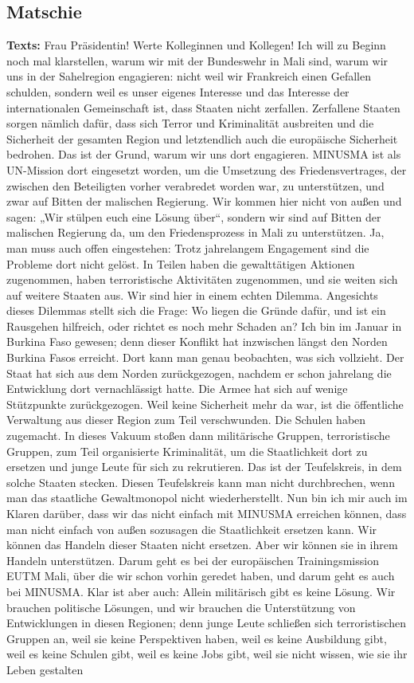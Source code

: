 \documentclass{article}
\begin{document}
\subsection{Matschie}
\noindent\textbf{Texts:} Frau Präsidentin! Werte Kolleginnen und Kollegen! Ich will zu Beginn noch mal klarstellen, warum wir mit der Bundeswehr in Mali sind, warum wir uns in der Sahelregion engagieren: nicht weil wir Frankreich einen Gefallen schulden, sondern weil es unser eigenes Interesse und das Interesse der internationalen Gemeinschaft ist, dass Staaten nicht zerfallen. Zerfallene Staaten sorgen nämlich dafür, dass sich Terror und Kriminalität ausbreiten und die Sicherheit der gesamten Region und letztendlich auch die europäische Sicherheit bedrohen. Das ist der Grund, warum wir uns dort engagieren.  MINUSMA ist als UN-Mission dort eingesetzt worden, um die Umsetzung des Friedensvertrages, der zwischen den Beteiligten vorher verabredet worden war, zu unterstützen, und zwar auf Bitten der malischen Regierung. Wir kommen hier nicht von außen und sagen: „Wir stülpen euch eine Lösung über“, sondern wir sind auf Bitten der malischen Regierung da, um den Friedensprozess in Mali zu unterstützen. Ja, man muss auch offen eingestehen: Trotz jahrelangem Engagement sind die Probleme dort nicht gelöst. In Teilen haben die gewalttätigen Aktionen zugenommen, haben terroristische Aktivitäten zugenommen, und sie weiten sich auf weitere Staaten aus. Wir sind hier in einem echten Dilemma. Angesichts dieses Dilemmas stellt sich die Frage: Wo liegen die Gründe dafür, und ist ein Rausgehen hilfreich, oder richtet es noch mehr Schaden an? Ich bin im Januar in Burkina Faso gewesen; denn dieser Konflikt hat inzwischen längst den Norden Burkina Fasos erreicht. Dort kann man genau beobachten, was sich vollzieht. Der Staat hat sich aus dem Norden zurückgezogen, nachdem er schon jahrelang die Entwicklung dort vernachlässigt hatte. Die Armee hat sich auf wenige Stützpunkte zurückgezogen. Weil keine Sicherheit mehr da war, ist die öffentliche Verwaltung aus dieser Region zum Teil verschwunden. Die Schulen haben zugemacht. In dieses Vakuum stoßen dann militärische Gruppen, terroristische Gruppen, zum Teil organisierte Kriminalität, um die Staatlichkeit dort zu ersetzen und junge Leute für sich zu rekrutieren. Das ist der Teufelskreis, in dem solche Staaten stecken. Diesen Teufelskreis kann man nicht durchbrechen, wenn man das staatliche Gewaltmonopol nicht wiederherstellt. Nun bin ich mir auch im Klaren darüber, dass wir das nicht einfach mit MINUSMA erreichen können, dass man nicht einfach von außen sozusagen die Staatlichkeit ersetzen kann. Wir können das Handeln dieser Staaten nicht ersetzen. Aber wir können sie in ihrem Handeln unterstützen. Darum geht es bei der europäischen Trainingsmission EUTM Mali, über die wir schon vorhin geredet haben, und darum geht es auch bei MINUSMA. Klar ist aber auch: Allein militärisch gibt es keine Lösung. Wir brauchen politische Lösungen, und wir brauchen die Unterstützung von Entwicklungen in diesen Regionen; denn junge Leute schließen sich terroristischen Gruppen an, weil sie keine Perspektiven haben, weil es keine Ausbildung gibt, weil es keine Schulen gibt, weil es keine Jobs gibt, weil sie nicht wissen, wie sie ihr Leben gestalten 
\end{document}
